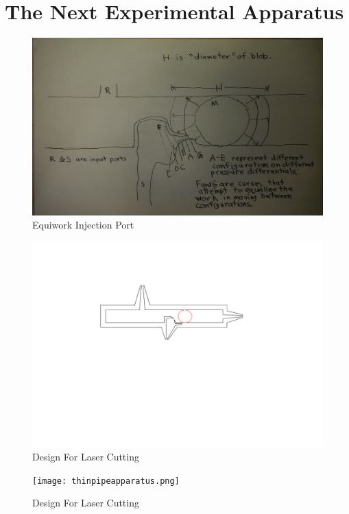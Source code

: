\documentclass{article}
\begin{document}
\section{The Next Experimental Apparatus}


\begin{figure}
  \centering
     \includegraphics[width=1.0\textwidth]{CurvedInjection.jpg}
     \caption{Equiwork Injection Port}
  \label{fig:closeup}     
\end{figure}


\begin{figure}
  \centering
     \includegraphics[width=1.0\textwidth]{designforlasercutting.png}
     \caption{Design For Laser Cutting}
  \label{fig:broadapparatus}     
\end{figure}

\begin{figure}
  \centering
     \texttt{[image: thinpipeapparatus.png]}
     \caption{Design For Laser Cutting}
  \label{fig:thinpipeapparatus}     
\end{figure}
\end{document}
